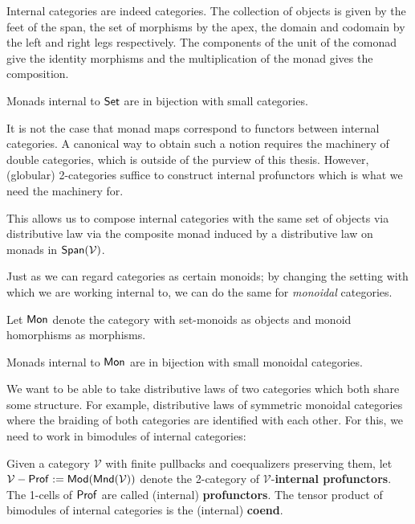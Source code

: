 Internal categories are indeed categories.  The collection of objects is given by the feet of the span, the set of morphisms by the apex, the domain and codomain by the left and right legs respectively.  The components of the unit of the comonad give the identity morphisms and the multiplication of the monad gives the composition.

\begin{lemma}
\label{lem:internalcat}

Monads internal to $\mathsf{Set}$ are in bijection with small categories.
\end{lemma}


It is not the case that monad maps correspond to functors between internal categories.  A canonical way to obtain such a notion requires the machinery of double categories, which is outside of the purview of this thesis.  However, (globular) 2-categories suffice to construct internal profunctors which is what we need the machinery for.


This allows us to compose internal categories with the same set of objects via distributive law via the composite monad induced by a distributive law on monads in $\mathsf{Span}(\mathcal{V})$.


Just as we can regard categories as certain monoids; by changing the setting with which we are working internal to, we can do the same for {\em monoidal} categories.

\begin{definition}
\label{def:monoid}
Let ${\sf Mon}$ denote the category with set-monoids as objects and monoid homorphisms as morphisms.
\end{definition}



\begin{lemma}
\label{def:internalmonoidalcat}

Monads internal to ${\sf Mon}$ are in bijection with small monoidal categories.
\end{lemma}

We want to be able to take distributive laws of two categories which both share some structure.  For example, distributive laws of symmetric monoidal categories where the braiding of both categories are identified with each other.  For this, we need to work in bimodules of internal categories:

\begin{definition}
Given a category $\mathcal V$ with finite pullbacks and coequalizers preserving them, let $\mathcal V-{\sf Prof}:={\sf Mod}({\sf Mnd}(\mathcal V))$ denote the 2-category of $\mathcal V$-{\bf internal profunctors}.  
The 1-cells of ${\sf Prof}$ are called (internal) {\bf  profunctors}.
The tensor product of bimodules of internal categories is the (internal) {\bf coend}.
\end{definition}




